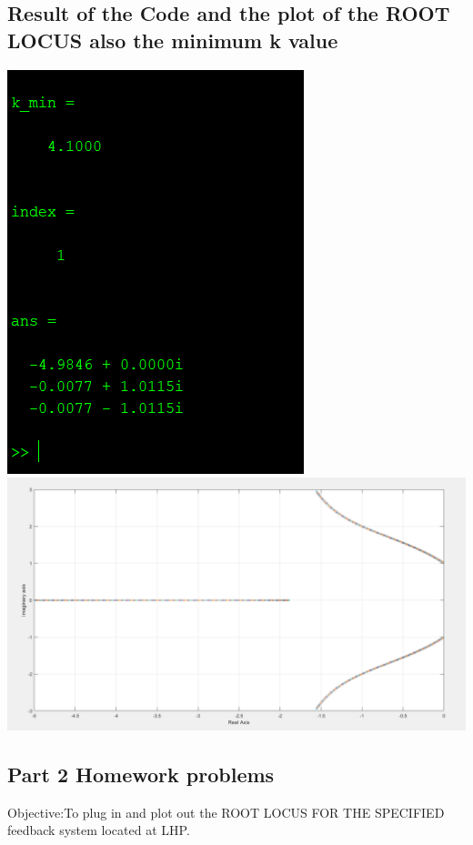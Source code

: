 \documentclass[12pt]{article}
\begin{document}
\subsection{Result of the Code and the plot of the ROOT LOCUS also the minimum k value}
\includegraphics[scale=0.7]{Result1.png}\\
\cleardoublepage
\includegraphics[scale=0.5]{Plot1.png}\\

\cleardoublepage


\subsection{Part 2 Homework problems}
Objective:To plug in and plot out the ROOT LOCUS FOR THE SPECIFIED feedback system located at LHP.
\end{document}
